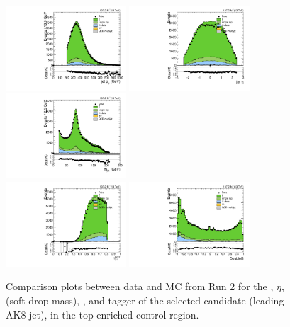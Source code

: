 \begin{figure}[htbp]
  \centering
  \includegraphics[width=0.4\textwidth]{fig/controlPlots/CR_b1_allL_allP_allC_allE_Run2_lnujj_l2_pt.pdf}
  \includegraphics[width=0.4\textwidth]{fig/controlPlots/CR_b1_allL_allP_allC_allE_Run2_lnujj_l2_eta.pdf}\\
  \includegraphics[width=0.4\textwidth]{fig/controlPlots/CR_b1_allL_allP_allC_allE_Run2_mjet.pdf}\\
  \includegraphics[width=0.4\textwidth]{fig/controlPlots/CR_b1_allL_allP_allC_allE_Run2_tau21DDT.pdf}
  \includegraphics[width=0.4\textwidth]{fig/controlPlots/CR_b1_allL_allP_allC_allE_Run2_DoubleB.pdf}\\
  \caption{
    Comparison plots between data and MC from Run 2 for the \pt, $\eta$, \MJ (soft drop mass), \nsubjDDT, and \DoubleB tagger of the selected \Vhad candidate (leading AK8 jet), in the top-enriched control region.
  }
  \label{fig:CR_controlPlotsRun2_3}
\end{figure}

